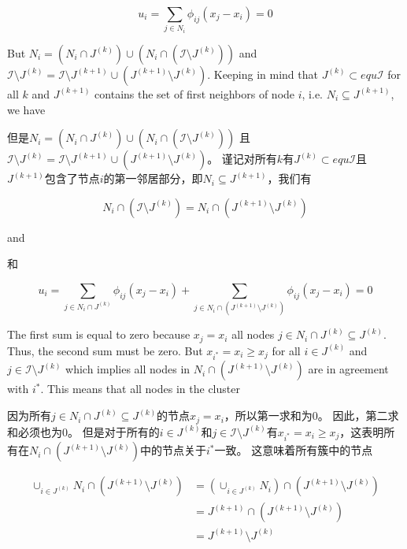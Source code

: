 \documentclass{article}
\begin{document}
\begin{equation}
    \tag{47}
    \label{47}
    u_i = \sum_{j\in N_i} \phi_{ij}(x_j-x_i)=0
\end{equation}

{\color[gray]{0.5}
\noindent But $N_i=(N_i\cap J^{(k)})\cup(N_i\cap(\mathcal{I}\setminus J^{(k)}))$ and $\mathcal{I}\setminus J^{(k)}=\mathcal{I}\setminus J^{(k+1)}\cup (J^{(k+1)}\setminus J^{(k)})$. 
Keeping in mind that $J^{(k)}\subset equ\mathcal{I}$ for all $k$ and $J^{(k+1)}$ contains the set of first neighbors of node $i$, i.e. $N_i\subseteq J^{(k+1)}$, we have
}

\noindent 但是$N_i=(N_i\cap J^{(k)})\cup(N_i\cap(\mathcal{I}\setminus J^{(k)}))$ 且 $\mathcal{I}\setminus J^{(k)}=\mathcal{I}\setminus J^{(k+1)}\cup (J^{(k+1)}\setminus J^{(k)})$。
谨记对所有$k$有$J^{(k)}\subset equ\mathcal{I}$且$J^{(k+1)}$包含了节点$i$的第一邻居部分，即$N_i\subseteq J^{(k+1)}$，我们有

\begin{equation}
    \tag{48}
    \label{48}
    N_i \cap (\mathcal{I}\setminus J^{(k)}) = N_i \cap (J^{(k+1)}\setminus J^{(k)})
\end{equation}

{\color[gray]{0.5}
\noindent and
}

\noindent 和

\begin{equation}
    \tag{49}
    \label{49}
    u_i = \sum_{j\in N_i \cap J^{(k)}} \phi_{ij}(x_j-x_i) + \sum_{j\in N_i \cap (J^{(k+1)}\setminus J^{(k)})} \phi_{ij}(x_j-x_i) = 0
\end{equation}

{\color[gray]{0.5}
\noindent The first sum is equal to zero because $x_j=x_i$ all nodes $j\in N_i \cap J^{(k)} \subseteq J^{(k)}$. 
Thus, the second sum must be zero. 
But $x_{i^*}=x_i\ge x_j$ for all $i\in J^{(k)}$ and $j\in \mathcal{I}\setminus J^{(k)}$ which implies all nodes in $N_i \cap (J^{(k+1)}\setminus J^{(k)})$ are in agreement with $i^*$. 
This means that all nodes in the cluster
}

\noindent 因为所有$j\in N_i \cap J^{(k)} \subseteq J^{(k)}$的节点$x_j=x_i$，所以第一求和为0。
因此，第二求和必须也为0。
但是对于所有的$i\in J^{(k)}$和$j\in \mathcal{I}\setminus J^{(k)}$有$x_{i^*}=x_i\ge x_j$，这表明所有在$N_i \cap (J^{(k+1)}\setminus J^{(k)})$中的节点关于$i^*$一致。
这意味着所有簇中的节点

\begin{equation}
    \tag{50}
    \label{50}
\begin{aligned}
    \cup_{i\in J^{(k)}} N_i \cap (J^{(k+1)} \setminus J^{(k)}) &= (\cup_{i\in J^{(k)}} N_i) \cap (J^{(k+1)} \setminus J^{(k)})\\
    &= J^{(k+1)} \cap (J^{(k+1)} \setminus J^{(k)})\\ 
    &= J^{(k+1)} \setminus J^{(k)}
\end{aligned}
\end{equation}
\end{document}
